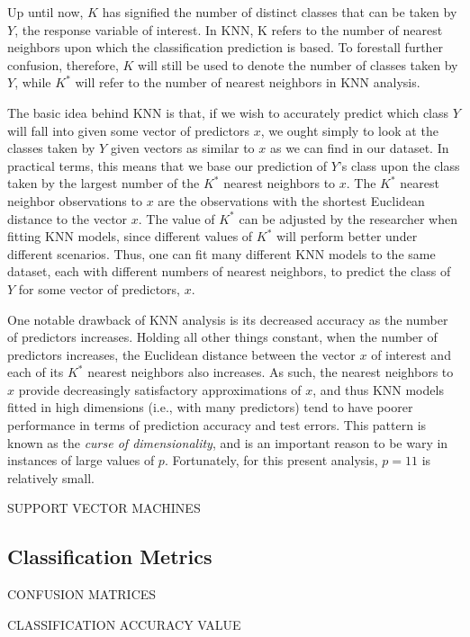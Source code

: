 \documentclass[12pt]{article}
\begin{document}
Up until now, $K$ has signified the number of distinct classes that can be taken by $Y$, 
the response variable of interest.  In KNN, K refers to the number of nearest neighbors 
upon which the classification prediction is based.  To forestall further confusion, 
therefore, $K$ will still be used to denote the number of classes taken by $Y$, while 
$K ^ *$ will refer to the number of nearest neighbors in KNN analysis.  

The basic idea behind KNN is that, if we wish to accurately predict which class $Y$ will 
fall into given some vector of predictors $x$, we ought simply to look at the classes 
taken by $Y$ given vectors as similar to $x$ as we can find in our dataset.  In practical 
terms, this means that we base our prediction of $Y$'s class upon the class taken by the 
largest number of the $K ^ *$ nearest neighbors to $x$.  The $K ^ *$ nearest neighbor 
observations to $x$ are the observations with the shortest Euclidean distance to the 
vector $x$.  The value of $K ^ *$ can be adjusted by the researcher when fitting KNN 
models, since different values of $K ^ *$ will perform better under different scenarios.  
Thus, one can fit many different KNN models to the same dataset, each with different 
numbers of nearest neighbors, to predict the class of $Y$ for some vector of predictors, 
$x$.  

One notable drawback of KNN analysis is its decreased accuracy as the number of 
predictors increases.  Holding all other things constant, when the number of predictors 
increases, the Euclidean distance between the vector $x$ of interest and each of its 
$K ^ *$ nearest neighbors also increases.  As such, the nearest neighbors to $x$ provide 
decreasingly satisfactory approximations of $x$, and thus KNN models fitted in high 
dimensions (i.e., with many predictors) tend to have poorer performance in terms of 
prediction accuracy and test errors.  This pattern is known as the 
\textit{curse of dimensionality}, and is an important reason to be wary in instances of 
large values of $p$.  Fortunately, for this present analysis, $p = 11$ is relatively 
small. 

SUPPORT VECTOR MACHINES

\subsection{Classification Metrics}
\label{sec:metr}

CONFUSION MATRICES

CLASSIFICATION ACCURACY VALUE
\end{document}

